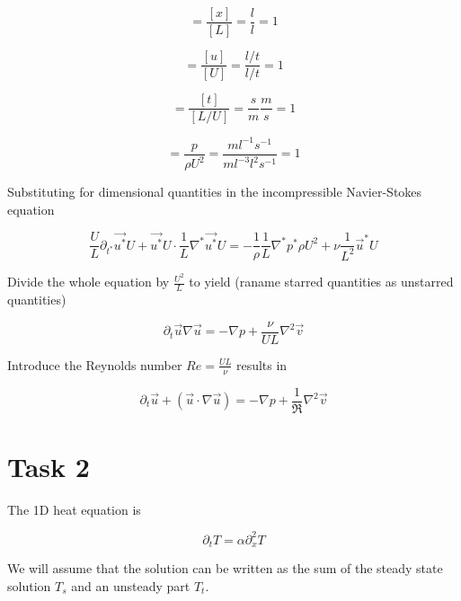 \documentclass{article}
\begin{document}
\begin{equation}
[\vec{x}^*] = \frac{[x]}{[L]} = \frac{l}{l} = 1
\end{equation}

\begin{equation}
[\vec{u}*] = \frac{[u]}{[U]} = \frac{l/t}{l/t} = 1 
\end{equation}

\begin{equation}
[t^*] = \frac{[t]}{[L/U]} = \frac{s}{m} \frac{m}{s} = 1
\end{equation}

\begin{equation}
[p^*] = \frac{p}{\rho U^2} = \frac{m l^{-1} s^{-1}}{m l^{-3} l^2s^{-1}} = 1
\end{equation}

Substituting for dimensional quantities in the incompressible Navier-Stokes equation

\begin{equation}
\frac{U}{L}\partial_{t^*} \vec{u^*} U + \vec{u^*} U \cdot \frac{1}{L}\nabla^* \vec{u^*} U = -\frac{1}{\rho} \frac{1}{L}\nabla^* p^* \rho U^2 + \nu \frac{1}{L^2}\vec{u}^*U
\end{equation}

Divide the whole equation by $\frac{U^2}{L}$ to yield (raname starred quantities as unstarred quantities)

\begin{equation}
\partial_t \vec{u} \nabla \vec{u} = -\nabla p + \frac{\nu }{UL} \nabla^2 \vec{v}
\end{equation}

Introduce the Reynolds number $Re = \frac{UL}{\nu}$ results in

\begin{equation}
\partial_t \vec{u} + (\vec{u}\cdot \nabla \vec{u}) = -\nabla p + \frac{1}{\Re} \nabla^2 \vec{v}
\end{equation}

\section{Task 2}

The 1D heat equation is

\begin{equation}
\partial_t T = \alpha \partial_x^2 T
\end{equation}

We will assume that the solution can be written as the sum of the steady state solution $T_s$ and an unsteady part $T_t$.
\end{document}
